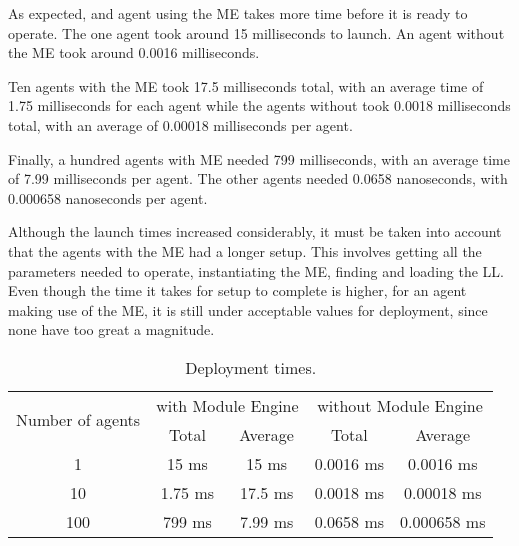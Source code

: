 As expected, and agent using the \acrshort{ME} takes more time before it is ready to operate. The one agent took around 15 milliseconds to launch. An agent without the \acrshort{ME} took around 0.0016 milliseconds.

Ten agents with the \acrshort{ME} took 17.5 milliseconds total, with an average time of 1.75 milliseconds for each agent while the agents without took 0.0018 milliseconds total, with an average of 0.00018 milliseconds per agent. 

Finally, a hundred agents with \acrshort{ME} needed 799 milliseconds, with an average time of 7.99 milliseconds per agent. The other agents needed 0.0658 nanoseconds, with 0.000658 nanoseconds per agent.

Although the launch times increased considerably, it must be taken into account that the agents with the \acrlong{ME} had a longer setup. This involves getting all the parameters needed to operate, instantiating the \acrshort{ME}, finding and loading the \acrshort{LL}. Even though the time it takes for setup to complete is higher, for an agent making use of the \acrshort{ME}, it is still under acceptable values for deployment, since none have too great a magnitude.\\ 

\begin{table}[h!]
	\caption{Deployment times.}
	\centering
	\begin{tabular}{|c|cc|cc|}
		\hline
		\multirow{2}{*}{Number of agents} & \multicolumn{2}{c|}{with Module Engine} 				& \multicolumn{2}{c|}{without Module Engine} \\ \cline{2-5} 
										  & \multicolumn{1}{c|}{Total}   	  & Average  			& \multicolumn{1}{c|}{Total}      			& Average  	  \\ \hline
		1                                 & \multicolumn{1}{c|}{15 ms}        & 15 ms               & \multicolumn{1}{c|}{0.0016 ms}    		& 0.0016 ms   \\ \hline
		10                                & \multicolumn{1}{c|}{1.75 ms}      & 17.5 ms             & \multicolumn{1}{c|}{0.0018 ms}    		& 0.00018 ms  \\ \hline
		100                               & \multicolumn{1}{c|}{799 ms}       & 7.99 ms             & \multicolumn{1}{c|}{0.0658 ms}  			& 0.000658 ms \\ \hline
	\end{tabular}
	\label{tab:deployment_times}
\end{table}\

